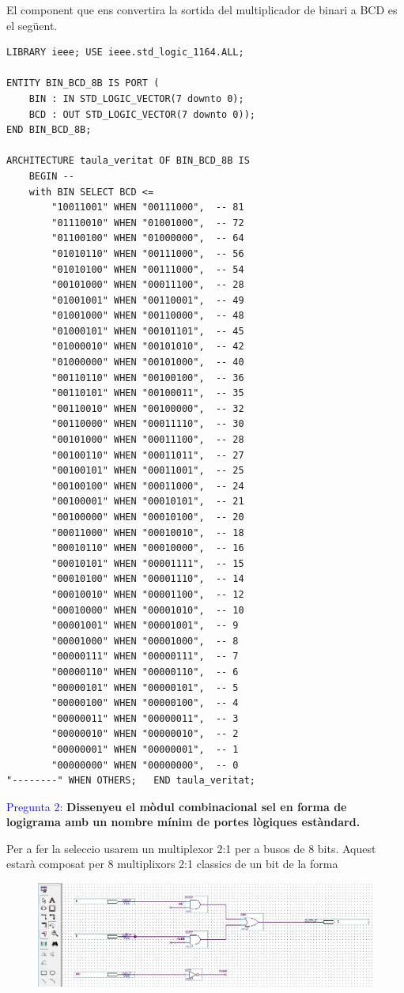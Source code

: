 \documentclass[12pt, a4papre]{article}
\begin{document}
	El component que ens convertira la sortida del multiplicador de binari a BCD es el següent.
	\begin{lstlisting}[style=vhdl, frame=single, basicstyle=\small]
LIBRARY ieee; USE ieee.std_logic_1164.ALL;  

ENTITY BIN_BCD_8B IS PORT (   
	BIN : IN STD_LOGIC_VECTOR(7 downto 0);   
	BCD : OUT STD_LOGIC_VECTOR(7 downto 0)); 
END BIN_BCD_8B;  

ARCHITECTURE taula_veritat OF BIN_BCD_8B IS   
	BEGIN --  
	with BIN SELECT BCD <=     	
		"10011001" WHEN "00111000",  -- 81     
		"01110010" WHEN "01001000",  -- 72      
		"01100100" WHEN "01000000",  -- 64     
		"01010110" WHEN "00111000",  -- 56     
		"01010100" WHEN "00111000",  -- 54     
		"00101000" WHEN "00011100",  -- 28     
		"01001001" WHEN "00110001",  -- 49     
		"01001000" WHEN "00110000",  -- 48     
		"01000101" WHEN "00101101",  -- 45     
		"01000010" WHEN "00101010",  -- 42     
		"01000000" WHEN "00101000",  -- 40     
		"00110110" WHEN "00100100",  -- 36     
		"00110101" WHEN "00100011",  -- 35     
		"00110010" WHEN "00100000",  -- 32     
		"00110000" WHEN "00011110",  -- 30     
		"00101000" WHEN "00011100",  -- 28     
		"00100110" WHEN "00011011",  -- 27     
		"00100101" WHEN "00011001",  -- 25     
		"00100100" WHEN "00011000",  -- 24     
		"00100001" WHEN "00010101",  -- 21     
		"00100000" WHEN "00010100",  -- 20     
		"00011000" WHEN "00010010",  -- 18     
		"00010110" WHEN "00010000",  -- 16     
		"00010101" WHEN "00001111",  -- 15     
		"00010100" WHEN "00001110",  -- 14     
		"00010010" WHEN "00001100",  -- 12     
		"00010000" WHEN "00001010",  -- 10     
		"00001001" WHEN "00001001",  -- 9     
		"00001000" WHEN "00001000",  -- 8     
		"00000111" WHEN "00000111",  -- 7     
		"00000110" WHEN "00000110",  -- 6     
		"00000101" WHEN "00000101",  -- 5     
		"00000100" WHEN "00000100",  -- 4    
		"00000011" WHEN "00000011",  -- 3     
		"00000010" WHEN "00000010",  -- 2     
		"00000001" WHEN "00000001",  -- 1     
		"00000000" WHEN "00000000",  -- 0     
"--------" WHEN OTHERS;   END taula_veritat;
\end{lstlisting}

	\textcolor{blue}{Pregunta 2:} \textbf{Dissenyeu el mòdul combinacional sel en forma de logigrama amb un nombre mínim de portes lògiques estàndard.} 
	 
	Per a fer la seleccio usarem un multiplexor 2:1 per a busos de 8 bits. Aquest estarà composat per 8 multiplixors 2:1 classics de un bit de la forma
	\begin{figure}[H]
		\begin{center}
		\includegraphics[width=130mm]{multiplexor2_1.jpeg}
		\end{center}
	\end{figure}
	
\end{document}
